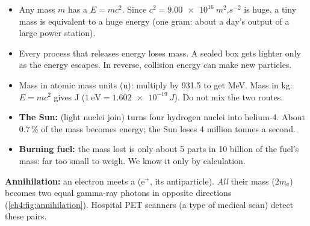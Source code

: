 \begin{itemize}
  \item Any mass $m$ has a  $E = mc^2$. Since
        $c^2 = \qty{9.00e16}{m^2.s^{-2}}$ is huge, a tiny mass is equivalent to a huge energy
        (one gram: about a day's output of a large power station).
  \item Every process that releases energy loses mass. A sealed box gets lighter only as the
        energy escapes. In reverse, collision energy can make new particles.
  \item Mass in atomic mass units (\si{\amu}): multiply by 931.5 to get MeV. Mass in kg:
        $E = mc^2$ gives J ($\qty{1}{\eV} = \qty{1.602e-19}{J}$). Do not mix the two routes.
  \item \textbf{The Sun:}  (light nuclei join) turns four hydrogen nuclei
        into helium-4. About 0.7\,\% of the mass becomes energy; the Sun loses 4 million tonnes a
        second.
  \item \textbf{Burning fuel:} the mass lost is only about 5 parts in 10 billion of the fuel's
        mass: far too small to weigh. We know it only by calculation.
\end{itemize}

\begin{sidebyside}[0.5]
  \centering
  \label{ch4:fig:annihilation}
\nextside
  \textbf{Annihilation:} an electron meets a  ($\mathrm{e}^+$, its antiparticle).
  \emph{All} their mass ($2m_\mathrm{e}$) becomes two equal gamma-ray photons in opposite
  directions (\cref{ch4:fig:annihilation}). Hospital PET scanners (a type of medical scan)
  detect these pairs.
\end{sidebyside}

